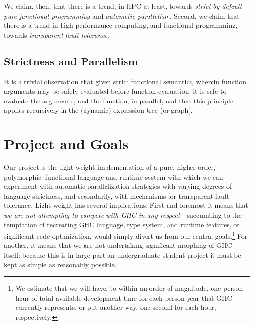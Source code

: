 \documentclass{llncs}
\begin{document}
We claim, then, that there is a trend, in HPC at least, towards
\emph{strict-by-default pure functional programming} and \emph{automatic
parallelism}.
Second, we claim that there is a trend in high-performance computing, and
functional programming, towards \emph{transparent fault tolerance}.

\subsection{Strictness and Parallelism}
It is a trivial observation that given strict functional semantics, wherein
function arguments may be safely evaluated before function evaluation, it is
safe to evaluate the arguments, and the function, in parallel, and that this
principle applies recursively in the (dynamic) expression tree (or graph).

\section{Project and Goals}
Our project is the light-weight implementation of a pure, higher-order,
polymorphic, functional language and runtime system with which we can
experiment with automatic parallelization strategies with varying degrees of
language strictness, and secondarily, with mechanisms for transparent fault
tolerance.  Light-weight has several implications.  First and foremost it
means that \emph{we are not attempting to compete with GHC in any
  respect}---succumbing to the temptation of recreating GHC language, type
system, and runtime features, or significant code optimization, would simply
divert us from our central goals.\footnote{We estimate that we will have, to
  within an order of magnitude, one person-hour of total available development
  time for each person-year that GHC currently represents, or put another way,
  one second for each hour, respectively.}  For another, it means that we are
not undertaking significant morphing of GHC itself: because this is in large
part an undergraduate student project it must be kept as simple as reasonably
possible.  
\end{document}
